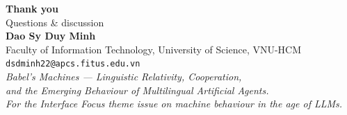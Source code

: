 \documentclass[11pt,aspectratio=169]{beamer}
\begin{document}
\begin{frame}
    \begin{center}
        \Huge \textcolor{rsnavy}{\textbf{Thank you}} \\[0.6cm]
        \large Questions \& discussion \\[0.8cm]
        \normalsize
        \textbf{Dao Sy Duy Minh}\\
        Faculty of Information Technology, University of Science, VNU-HCM\\
        \texttt{dsdminh22@apcs.fitus.edu.vn}\\[0.8cm]
        \scriptsize\itshape Babel's Machines --- Linguistic Relativity, Cooperation,\\and the Emerging Behaviour of Multilingual Artificial Agents.\\
        For the Interface Focus theme issue on machine behaviour in the age of LLMs.
    \end{center}
\end{frame}
\end{document}
